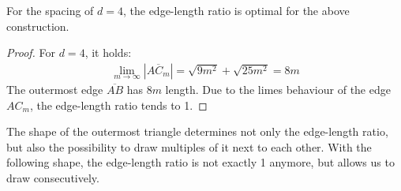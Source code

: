\begin{lemma}
	For the spacing of $d=4$, the edge-length ratio is optimal for the above construction.
\end{lemma}
\begin{proof}
	For $d=4$, it holds:
	\begin{align}
		\lim_{m\to\infty} |\overline{AC_m}| = \sqrt{9m^2} + \sqrt{25m^2} = 8m    \label{eq:lim}
	\end{align}
	The outermost edge $\overline{AB}$ has $8m$ length. Due to the limes behaviour of the edge $AC_m$, the edge-length ratio tends to 1.
\end{proof}
The shape of the outermost triangle determines not only the edge-length ratio, but also the possibility to draw multiples of it next to each other. With the following shape, the edge-length ratio is not exactly 1 anymore, but allows us to draw consecutively.
